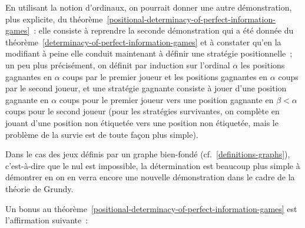 \documentclass[12pt,a4paper]{article}
\theoremstyle{definition}
\begin{document}
En utilisant la notion d'ordinaux, on pourrait donner une autre
démonstration, plus explicite, du
théorème \ref{positional-determinacy-of-perfect-information-games} :
elle consiste à reprendre la seconde démonstration qui a été donnée du
théorème \ref{determinacy-of-perfect-information-games} et à constater
qu'en la modifiant à peine elle conduit maintenant à définir une
stratégie positionnelle ; un peu plus précisément, on définit par
induction sur l'ordinal $\alpha$ les positions gagnantes en $\alpha$
coups par le premier joueur et les positions gagnantes en $\alpha$
coups par le second joueur, et une stratégie gagnante consiste à jouer
d'une position gagnante en $\alpha$ coups pour le premier joueur vers
une position gagnante en $\beta<\alpha$ coups pour le second joueur
(pour les stratégies survivantes, on complète en jouant d'une position
non étiquetée vers une position non étiquetée, mais le problème de la
survie est de toute façon plus simple).

Dans le cas des jeux définis par un graphe bien-fondé
(cf. \ref{definitions-graphs}), c'est-à-dire que le nul est
impossible, la détermination est beaucoup plus simple à démontrer en
on en verra encore une nouvelle démonstration dans le cadre de la
théorie de Grundy.

Un bonus au
théorème \ref{positional-determinacy-of-perfect-information-games} est
l'affirmation suivante :
\end{document}
